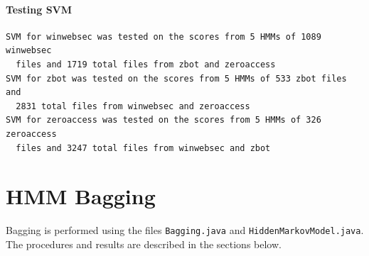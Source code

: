 \documentclass[12pt]{article}
\begin{document}
\paragraph{Testing SVM}
\begin{lstlisting}
SVM for winwebsec was tested on the scores from 5 HMMs of 1089 winwebsec
  files and 1719 total files from zbot and zeroaccess
SVM for zbot was tested on the scores from 5 HMMs of 533 zbot files and 
  2831 total files from winwebsec and zeroaccess
SVM for zeroaccess was tested on the scores from 5 HMMs of 326 zeroaccess 
  files and 3247 total files from winwebsec and zbot
\end{lstlisting}



\section{HMM Bagging}
  Bagging is performed using the files \texttt{Bagging.java} and \texttt{HiddenMarkovModel.java}. The procedures and results are described in the sections below.
\end{document}
